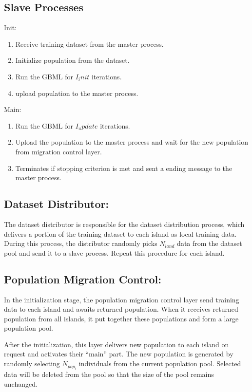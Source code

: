\documentclass[conference]{IEEEtran}
\begin{document}
  \subsection{Slave Processes}
  Init:
  \begin{enumerate}
  \item Receive training dataset from the master process.
  \item Initialize population from the dataset.
  \item Run the GBML for $I_init$ iterations.
  \item upload population to the master process.
  \end{enumerate}

  Main:
  \begin{enumerate}
  \item Run the GBML for $I_update$ iterations.
  \item Upload the population to the master process and wait for the new population from migration control layer.
  \item Terminates if stopping criterion is met and sent a ending message to the master process.
  \end{enumerate}

	\subsection{Dataset Distributor:}
	The dataset distributor is responsible for the dataset distribution process, which delivers a portion of the training dataset to each island as local training data. During this process, the distributor randomly picks $N_{land}$ data from the dataset pool and send it to a slave process. Repeat this procedure for each island.
  \subsection{Population Migration Control:}
  In the initialization stage, the population migration control layer send training data to each island and awaits returned population. When it receives returned population from all islands, it put together these populations and form a large population pool. 
	
	After the initialization, this layer delivers new population to each island on request and activates their “main” part. The new population is generated by randomly selecting $ N_{pop_i}$ individuals from the current population pool. Selected data will be deleted from the pool so that the size of the pool remains unchanged.
	
\end{document}
